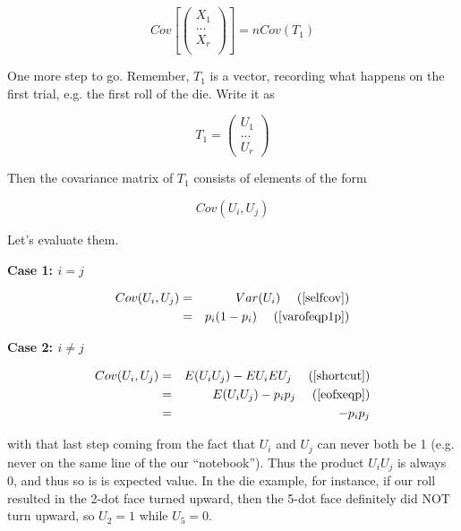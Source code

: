 \begin{equation}
\label{almostdone}
Cov \left [
\left ( \begin{array}{r}
X_1 \\
... \\
X_r \\
\end{array} \right )
\right ]
= n Cov(T_1)
\end{equation}

One more step to go.  Remember, $T_1$ is a vector, recording what
happens on the first trial, e.g. the first roll of the die.  Write it as

\begin{equation}
T_1 =
\left ( \begin{array}{r} 
U_1 \\
... \\
U_r
\end{array} \right )
\end{equation}

Then the covariance matrix of $T_1$ consists of elements of the form

\begin{equation}
Cov(U_i,U_j)
\end{equation}

Let's evaluate them.

{\bf Case 1:  $i = j$}

\begin{eqnarray}
Cov(U_i,U_j) &=& Var(U_i)  ~~~~ \textrm{(\ref{selfcov})}\\ 
&=& p_i (1-p_i) ~~~~ \textrm{(\ref{varofeqp1p})}
\end{eqnarray}

{\bf Case 2:  $i \neq j$}

\begin{eqnarray}
Cov(U_i,U_j) &=& E(U_i U_j) -EU_i EU_j  ~~~~ \textrm{(\ref{shortcut})}\\ 
&=& E(U_i U_j) - p_i p_j ~~~~ \textrm{(\ref{eofxeqp})} \\
&=& -p_i p_j
\end{eqnarray}

with that last step coming from the fact that $U_i$ and $U_j$ can never
both be 1 (e.g. never on the same line of the our ``notebook'').  Thus
the product $U_i U_j$ is always 0, and thus so is is expected value.  In
the die example, for instance, if our roll resulted in the 2-dot face
turned upward, then the 5-dot face definitely did NOT turn upward, so
$U_2 = 1$ while $U_5 = 0$.

